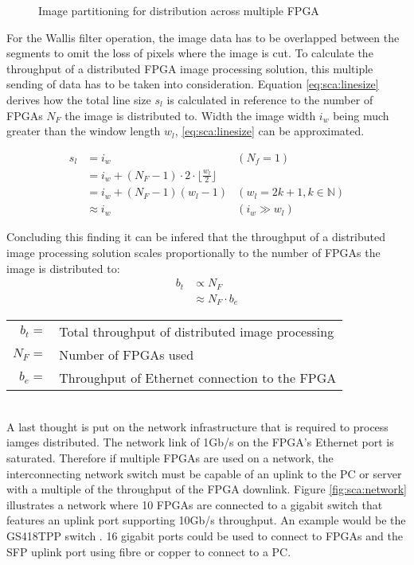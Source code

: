 \begin{figure}[tb!]
    \centering
    \begin{adjustbox}{max width=\linewidth}
        
    \end{adjustbox}
    \caption{Image partitioning for distribution across multiple FPGA}
    \label{fig:sca:acrossfpgapart}
\end{figure}

For the Wallis filter operation, the image data has to be overlapped between the
segments to omit the loss of pixels where the image is cut. To calculate the
throughput of a distributed FPGA image processing solution, this multiple
sending of data has to be taken into consideration. Equation 
\ref{eq:sca:linesize} derives how the total line size $s_l$ is calculated in
reference to the number of FPGAs $N_F$ the image is distributed to. Width the
image width $i_w$ being much greater than the window length $w_l$, 
\ref{eq:sca:linesize} can be approximated.

\begin{align}
    s_l  & = i_w & (N_f = 1) \\
         & = i_w + (N_F-1) \cdot 2 \cdot \lfloor\frac{w_l}{2}\rfloor & \\
         & = i_w + (N_F-1)(w_l-1) & (w_l=2k+1, k \in \mathbb{N} )\\
         & \approx i_w & (i_w \gg w_l)
    \label{eq:sca:linesize}
\end{align}

Concluding this finding it can be infered that the throughput of a distributed
image processing solution scales proportionally to the number of FPGAs the image
is distributed to:
\begin{align}
    b_t & \propto N_F \\
        & \approx N_F \cdot b_e
\end{align}
\begin{tabular}{rl}
    $b_t        =$ & Total throughput of distributed image processing \\
    $N_F        =$ & Number of FPGAs used \\
    $b_e        =$ & Throughput of Ethernet connection to the FPGA \\
\end{tabular} \\

A last thought is put on the network infrastructure that is required to
process iamges distributed. The network link of 1Gb/s on the FPGA's Ethernet
port is saturated. Therefore if multiple FPGAs are used on a network, the
interconnecting network switch must be capable of an uplink to the PC or server
with a multiple of the throughput of the FPGA downlink. Figure 
\ref{fig:sca:network} illustrates a network where 10 FPGAs are connected to a
gigabit switch that features an uplink port supporting 10Gb/s throughput. An
example would be the GS418TPP switch \cite{netgearswitch}. 16 gigabit ports
could be used to connect to FPGAs and the SFP uplink port using fibre or copper
to connect to a PC.

